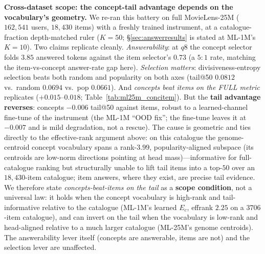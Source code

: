 \documentclass[11pt]{article}
\begin{document}
\textbf{Cross-dataset scope: the concept-tail advantage depends on the vocabulary's geometry.} We re-ran this battery
on full MovieLens-25M ($162{,}541$ users, $18{,}430$ items) with a freshly trained instrument, at a catalogue-fraction
depth-matched ruler ($K{=}50$; \S\ref{sec:answerresults} is stated at ML-1M's $K{=}10$). Two claims replicate cleanly.
\emph{Answerability}: at $q8$ the concept selector folds $3.85$ answered tokens against the item selector's $0.73$
(a $5{:}1$ rate, matching the item-vs-concept answer-rate gap here). \emph{Selection matters}: divisiveness-entropy
selection beats both random and popularity on both axes (tail@50 $0.0812$ vs.\ random $0.0694$ vs.\ pop $0.0661$).
And \emph{concepts beat items on the FULL metric} replicates ($+0.015$--$0.018$; Table~\ref{tab:ml25m_concitem}). But
the \textbf{tail advantage reverses}: concepts $-0.006$ tail@50 against items, robust to a learned-channel fine-tune
of the instrument (the ML-1M ``OOD fix''; the fine-tune leaves it at $-0.007$ and is mild degradation, not a rescue).
The cause is geometric and ties directly to the effective-rank argument above: on this catalogue the genome-centroid
concept vocabulary spans a rank-$3.99$, popularity-aligned subspace (its centroids are low-norm directions pointing at
head mass)---informative for full-catalogue ranking but structurally unable to lift tail items into a top-$50$ over an
$18{,}430$-item catalogue; item answers, where they exist, are precise tail evidence. We therefore state
\emph{concepts-beat-items on the tail} as a \textbf{scope condition}, not a universal law: it holds when the concept
vocabulary is high-rank and tail-informative relative to the catalogue (ML-1M's learned $E_c$, effrank $2.25$ on a
$3706$-item catalogue), and can invert on the tail when the vocabulary is low-rank and head-aligned relative to a much
larger catalogue (ML-25M's genome centroids). The answerability lever itself (concepts are answerable, items are not)
and the selection lever are unaffected.
\end{document}

